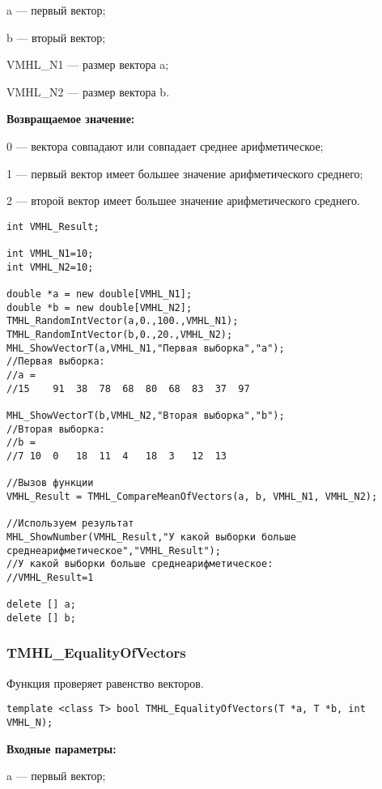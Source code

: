 \documentclass[a4paper,12pt]{article}
\begin{document}
a --- первый вектор;
 
b --- вторый вектор;
 
VMHL\_N1 --- размер вектора a;
 
VMHL\_N2 --- размер вектора b.

\textbf{Возвращаемое значение:}

0 --- вектора совпадают или совпадает среднее арифметическое;
 
1 --- первый вектор имеет большее значение арифметического среднего;
 
2 --- второй вектор имеет большее значение арифметического среднего.


\begin{lstlisting}[label=code_use_TMHL_CompareMeanOfVectors,caption=Пример использования]
int VMHL_Result;

int VMHL_N1=10;
int VMHL_N2=10;

double *a = new double[VMHL_N1];
double *b = new double[VMHL_N2];
TMHL_RandomIntVector(a,0.,100.,VMHL_N1);
TMHL_RandomIntVector(b,0.,20.,VMHL_N2);
MHL_ShowVectorT(a,VMHL_N1,"Первая выборка","a");
//Первая выборка:
//a =
//15	91	38	78	68	80	68	83	37	97

MHL_ShowVectorT(b,VMHL_N2,"Вторая выборка","b");
//Вторая выборка:
//b =
//7	10	0	18	11	4	18	3	12	13

//Вызов функции
VMHL_Result = TMHL_CompareMeanOfVectors(a, b, VMHL_N1, VMHL_N2);

//Используем результат
MHL_ShowNumber(VMHL_Result,"У какой выборки больше среднеарифметическое","VMHL_Result");
//У какой выборки больше среднеарифметическое:
//VMHL_Result=1

delete [] a;
delete [] b;
\end{lstlisting}

\subsubsection{TMHL\_EqualityOfVectors}\label{TMHL_EqualityOfVectors}

Функция проверяет равенство векторов.


\begin{lstlisting}[label=code_syntax_TMHL_EqualityOfVectors,caption=Синтаксис]
template <class T> bool TMHL_EqualityOfVectors(T *a, T *b, int VMHL_N);
\end{lstlisting}

\textbf{Входные параметры:}

  a --- первый вектор;
  
\end{document}
